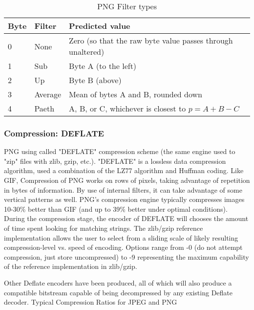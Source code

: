 \begin{table}
\begin{tabular}{|l|l|p{10em}|}\hline
Byte		& Filter	& Predicted value \\\hline
0		& None	 	& Zero (so that the raw byte value passes through unaltered) \\\hline
1		& Sub		& Byte A (to the left) \\\hline
2		& Up		& Byte B (above) \\\hline
3		& Average	& Mean of bytes A and B, rounded down \\\hline
4		& Paeth		& A, B, or C, whichever is closest to $p = A + B - C$ \\\hline
\end{tabular}
\caption{PNG Filter types}
\label{tab:filtertypes}
\end{table}

\subsubsection{Compression: DEFLATE}
PNG using called "DEFLATE" compression scheme (the same engine used to "zip" files with zlib, gzip, etc.).  "DEFLATE" is a lossless data compression algorithm, used a combination of the LZ77 algorithm and Huffman coding. Like GIF, Compression of PNG works on rows of pixels, taking advantage of repetition in bytes of information. By use of internal filters, it can take advantage of some vertical patterns as well. PNG's compression engine typically compresses images 10-30\% better than GIF (and up to 39\% better under optimal conditions). During the compression stage, the encoder of DEFLATE will chooses the amount of time spent looking for matching strings. The zlib/gzip reference implementation allows the user to select from a sliding scale of likely resulting compression-level vs. speed of encoding. Options range from -0 (do not attempt compression, just store uncompressed) to -9 representing the maximum capability of the reference implementation in zlib/gzip.
 
Other Deflate encoders have been produced, all of which will also produce a compatible bitstream capable of being decompressed by any existing Deflate decoder. 
Typical Compression Ratios for JPEG and PNG

